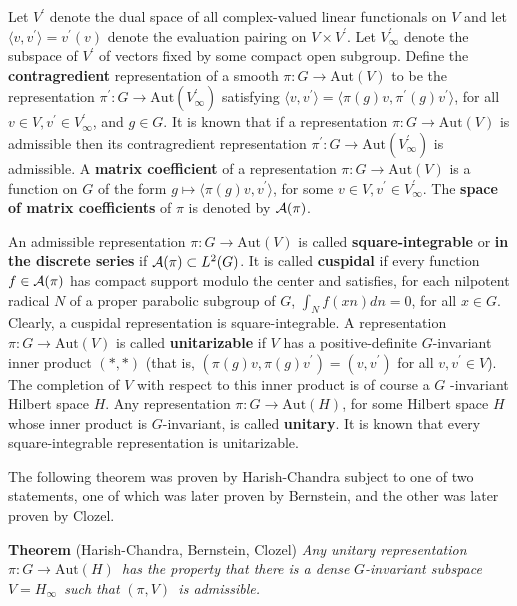 \documentclass[11pt, a4paper]{article}
\begin{document}
Let $V^{\prime }$ denote the dual space of all complex-valued linear
functionals on $V$ and let $\langle v,v^{\prime }\rangle =v^{\prime }(v)$ denote the
evaluation pairing on $V\times V^{\prime }$. Let $V_\infty ^{\prime }$
denote the subspace of $V^{\prime }$ of vectors fixed by some compact open
subgroup. Define the {\bf contragredient} representation of a smooth
$\pi :G\rightarrow \mathrm{Aut}(V)$ to be the representation $\pi ^{\prime }:G\rightarrow
\mathrm{Aut}(V_\infty ^{\prime })$ satisfying $\langle v,v^{\prime }\rangle =\langle \pi (g)v,\pi ^{\prime }(g)v^{\prime }\rangle $,
for all $v\in V,v^{\prime }\in V_\infty ^{\prime }$, and
$g\in G$. It is known that if a representation $\pi :G\rightarrow \mathrm{Aut}(V)$ is
admissible then its contragredient representation $\pi ^{\prime
}:G\rightarrow \mathrm{Aut}(V_\infty ^{\prime })$ is admissible. A {\bf matrix
coefficient} of a representation $\pi :G\rightarrow \mathrm{Aut}(V)$ is a function on
$G$ of the form $g\longmapsto \langle \pi (g)v,v^{\prime }\rangle $, for some
$v\in V,v^{\prime }\in V_\infty ^{\prime }$. The {\bf space of matrix coefficients}
of $\pi $ is denoted by ${\cal A}(\pi )$.

An admissible representation $\pi :G\rightarrow \mathrm{Aut}(V)$ is called {\bf %
square-integrable} or {\bf in the discrete series} if ${\cal A}(\pi )\subset
L^2(G)$. It is called {\bf cuspidal} if every function $f\in {\cal A}(\pi )$
has compact support modulo the center and satisfies, for each nilpotent
radical $N$ of a proper parabolic subgroup of $G$, $\int_Nf(xn)dn=0$, for
all $x\in G$. Clearly, a cuspidal representation is square-integrable. A
representation $\pi :G\rightarrow \mathrm{Aut}(V)$ is called {\bf unitarizable} if $V$
has a positive-definite $G$-invariant inner product $(*,*)$ (that is, $(\pi
(g)v,\pi (g)v^{\prime })=(v,v^{\prime })$ for all $v,v^{\prime }\in V$). The
completion of $V$ with respect to this inner product is of course a $G$%
-invariant Hilbert space $H$. Any representation $\pi :G\rightarrow \mathrm{Aut}(H)$,
for some Hilbert space $H$ whose inner product is $G$-invariant, is called 
{\bf unitary}. It is known that every square-integrable representation is
unitarizable.

The following theorem was proven by Harish-Chandra subject to one of two
statements, one of which was later proven by Bernstein, and the other was
later proven by Clozel.

{\bf Theorem} (Harish-Chandra, Bernstein, Clozel) {\em Any unitary
representation }$\pi :G\rightarrow \mathrm{Aut}(H)${\em \ has the property that there
is a dense }$G${\em -invariant subspace }$V=H_\infty ${\em \ such that }$%
(\pi ,V)${\em \ is admissible.}
\end{document}
